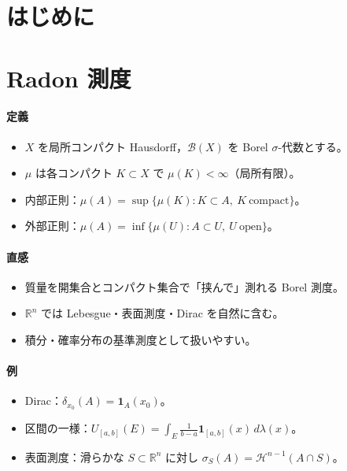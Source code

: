 \documentclass[dvipdfmx,autodetect-engine]{article}
\title{\papertitle}
\author{\paperauthor \\ \paperaffil}
\date{\paperdate}
\begin{document}
\maketitle

\section{はじめに}

\section*{Radon 測度}
\paragraph{定義}
\begin{itemize}
  \item \(X\) を局所コンパクト Hausdorff，\(\mathcal{B}(X)\) を Borel \(\sigma\)-代数とする。
  \item \(\mu\) は各コンパクト \(K\subset X\) で \(\mu(K)<\infty\)（局所有限）。
  \item 内部正則：\(\mu(A)=\sup\{\mu(K):K\subset A,\ K\ \text{compact}\}\)。
  \item 外部正則：\(\mu(A)=\inf\{\mu(U):A\subset U,\ U\ \text{open}\}\)。
\end{itemize}
\paragraph{直感}
\begin{itemize}
  \item 質量を開集合とコンパクト集合で「挟んで」測れる Borel 測度。
  \item \(\mathbb{R}^n\) では Lebesgue・表面測度・Dirac を自然に含む。
  \item 積分・確率分布の基準測度として扱いやすい。
\end{itemize}
\paragraph{例}
\begin{itemize}
  \item Dirac：\(\delta_{x_0}(A)=\mathbf{1}_A(x_0)\)。
  \item 区間の一様：\(U_{[a,b]}(E)=\int_E \frac{1}{b-a}\mathbf{1}_{[a,b]}(x)\,d\lambda(x)\)。
  \item 表面測度：滑らかな \(S\subset\mathbb{R}^n\) に対し \(\sigma_S(A)=\mathcal{H}^{n-1}(A\cap S)\)。
\end{itemize}
\end{document}
